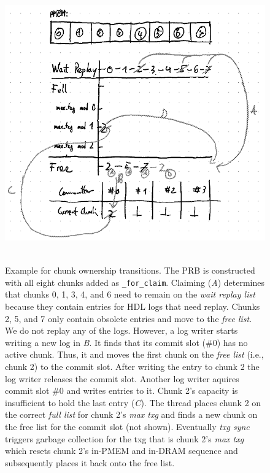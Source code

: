 \documentclass[12pt,a4paper,twoside]{book}
\begin{document}
\begin{figure}[H]
    \centering
    \includegraphics[height=12cm]{fig/prb_chunk_ownership_cycle__example}
    \caption{
        Example for chunk ownership transitions.
        The PRB is constructed with all eight chunks added as \lstinline{_for_claim}.
        Claiming (\textit{A}) determines that chunks 0, 1, 3, 4, and 6 need to remain on the \textit{wait replay list} because they contain entries for HDL logs that need replay.
        Chunks 2, 5, and 7 only contain obsolete entries and move to the \textit{free list}.
        We do not replay any of the logs.
        However, a log writer starts writing a new log in \textit{B}.
        It finds that its commit slot (\#0) has no active chunk.
        Thus, it and moves the first chunk on the \textit{free list} (i.e., chunk 2) to the commit slot.
        After writing the entry to chunk 2 the log writer releases the commit slot.
        Another log writer aquires commit slot \#0 and writes entries to it.
        Chunk 2's capacity is insufficient to hold the last entry (\textit{C}).
        The thread places chunk 2 on the correct \textit{full list} for chunk 2's \textit{max txg} and finds a new chunk on the free list for the commit slot (not shown).
        Eventually \textit{txg sync} triggers garbage collection for the txg that is chunk 2's \textit{max txg} which resets chunk 2's in-PMEM and in-DRAM sequence and subsequently places it back onto the free list.
    }
    \label{fig:prb_chunk_ownership_cycle__example}
\end{figure}
\end{document}
